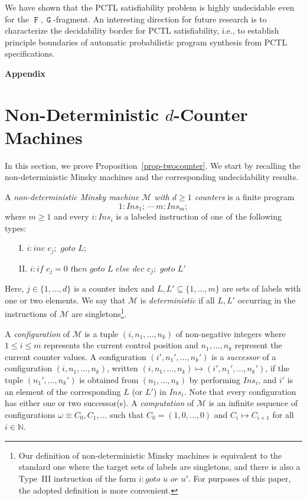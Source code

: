 \documentclass[a4paper,UKenglish,cleveref, autoref, thm-restate]{lipics-v2021}
\newcommand{\N}{\mathbb{N}}
\newcommand{\M}{\mathcal{M}}
\newcommand{\Ins}{\mathit{Ins}}
\newcommand*{\opf}{\operatorname{\pmb{\mathtt{F}}}}
\newcommand*{\opg}{\operatorname{\pmb{\mathtt{G}}}}
\begin{document}
We have shown that the PCTL satisfiability problem is highly undecidable even for the \mbox{$\opf,\opg$-fragment}. An interesting direction for future research is to characterize the decidability border for PCTL satisfiability, i.e., to establish principle boundaries of automatic probabilistic program synthesis from PCTL specifications.




\clearpage
\appendix

\begin{center}
  \huge\bf Appendix
\end{center}
\section{Non-Deterministic $d$-Counter Machines}
\label{app-Minsky}

In this section, we prove Proposition~\ref{prop-twocounter}. We start by recalling the non-deterministic Minsky machines \cite{Minsky:book} and the corresponding undecidability results.

A \emph{non-deterministic Minsky machine $\M$ with $d \geq 1$ counters} is a finite program
\[
    1: \Ins_1; \ \cdots  \ m: \Ins_m;\]
where $m \geq 1$ and every $i: \Ins_i$ is a labeled instruction of one of the following types:
\begin{itemize}
  \item[I.] $i: \textit{inc } c_j; \textit{ goto } L;$ 
  \item[II.] $i: \textit{if } c_j{=}0 \textit{ then goto } L \textit{ else dec } c_j; \textit{ goto } L'$
\end{itemize}
Here, $j \in \{1,\ldots,d\}$ is a counter index and $L,L' \subseteq \{1,\ldots,m\}$
are sets of labels with one or two elements. We say that $\M$ is \emph{deterministic} if all $L,L'$ occurring in the instructions of $\M$ are singletons\footnote{Our definition of non-deterministic Minsky machines is equivalent to the standard one where the target sets of labels are singletons, and there is also a Type~III instruction of the form $i: \textit{goto } u \textit{ or } u'$. For purposes of this paper, the adopted definition is more convenient.}.

A \emph{configuration} of $\M$ is a tuple $(i,n_1,\ldots,n_k)$ of non-negative integers where $1 \leq i \leq m$ represents the current control position and $n_1,\ldots,n_k$ represent the current counter values. A configuration $(i',n_1',\ldots,n_k')$ is a \emph{successor} of a configuration  $(i,n_1,\ldots,n_k)$, written $(i,n_1,\ldots,n_k) \mapsto (i',n_1',\ldots,n_k')$, if the tuple  $(n_1',\ldots,n_k')$ is obtained from $(n_1,\ldots,n_k)$ by performing $\Ins_i$, and $i'$ is an element of the corresponding $L$ (or $L'$) in $\Ins_i$. Note that every configuration has either one or two successor(s). A \emph{computation} of $\M$ is an infinite sequence of configurations $\omega \equiv C_0,C_1,\ldots$ such that $C_0 = (1,0,\ldots,0)$ and $C_i \mapsto C_{i+1}$ for all $i \in \N$. 
\end{document}
